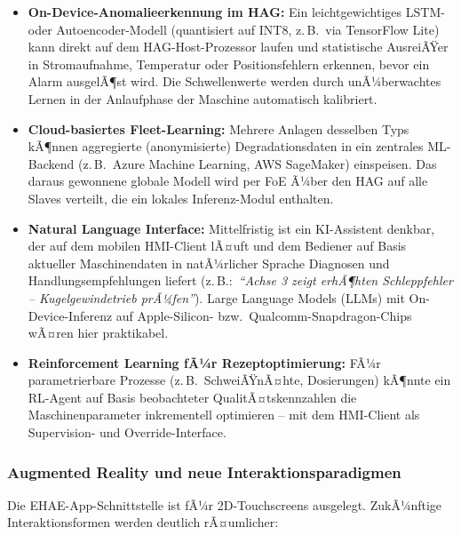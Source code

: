 ﻿\documentclass[12pt,a4paper]{article}
\begin{document}
\begin{itemize}[leftmargin=2em]
  \item \textbf{On-Device-Anomalieerkennung im HAG:} Ein leichtgewichtiges
    LSTM- oder Autoencoder-Modell (quantisiert auf INT8, z.\,B.\ via TensorFlow
    Lite) kann direkt auf dem HAG-Host-Prozessor laufen und statistische
    AusreiÃŸer in Stromaufnahme, Temperatur oder Positionsfehlern erkennen,
    bevor ein Alarm ausgelÃ¶st wird. Die Schwellenwerte werden durch
    unÃ¼berwachtes Lernen in der Anlaufphase der Maschine automatisch kalibriert.
  \item \textbf{Cloud-basiertes Fleet-Learning:} Mehrere Anlagen desselben
    Typs kÃ¶nnen aggregierte (anonymisierte) Degradationsdaten in ein zentrales
    ML-Backend (z.\,B.\ Azure Machine Learning, AWS SageMaker) einspeisen.
    Das daraus gewonnene globale Modell wird per FoE Ã¼ber den HAG auf alle
    Slaves verteilt, die ein lokales Inferenz-Modul enthalten.
  \item \textbf{Natural Language Interface:} Mittelfristig ist ein
    KI-Assistent denkbar, der auf dem mobilen HMI-Client lÃ¤uft und dem
    Bediener auf Basis aktueller Maschinendaten in natÃ¼rlicher Sprache
    Diagnosen und Handlungsempfehlungen liefert (z.\,B.:\ \emph{``Achse 3
    zeigt erhÃ¶hten Schleppfehler -- Kugelgewindetrieb prÃ¼fen''}).
    Large Language Models (LLMs) mit On-Device-Inferenz auf
    Apple-Silicon- bzw.\ Qualcomm-Snapdragon-Chips wÃ¤ren hier praktikabel.
  \item \textbf{Reinforcement Learning fÃ¼r Rezeptoptimierung:} FÃ¼r
    parametrierbare Prozesse (z.\,B.\ SchweiÃŸnÃ¤hte, Dosierungen) kÃ¶nnte
    ein RL-Agent auf Basis beobachteter QualitÃ¤tskennzahlen die
    Maschinenparameter inkrementell optimieren -- mit dem HMI-Client als
    Supervision- und Override-Interface.
\end{itemize}

\subsubsection*{Augmented Reality und neue Interaktionsparadigmen}

Die EHAE-App-Schnittstelle ist fÃ¼r 2D-Touchscreens ausgelegt. ZukÃ¼nftige
Interaktionsformen werden deutlich rÃ¤umlicher:
\end{document}
